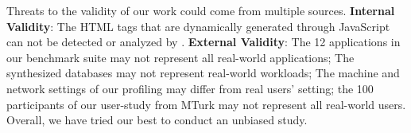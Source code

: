 Threats to the validity of our work could come from multiple
sources. 
\textbf{Internal Validity}: The HTML tags that are dynamically generated through JavaScript can not be detected or analyzed by \Tool. \textbf{External Validity}: The 12 applications in our benchmark suite may not represent all real-world applications; The synthesized databases may not represent real-world workloads; The machine and network settings of our profiling may differ from real users’ setting; the 100 participants of our user-study from MTurk may not represent all real-world users. Overall, we have tried our best to conduct an unbiased study.

